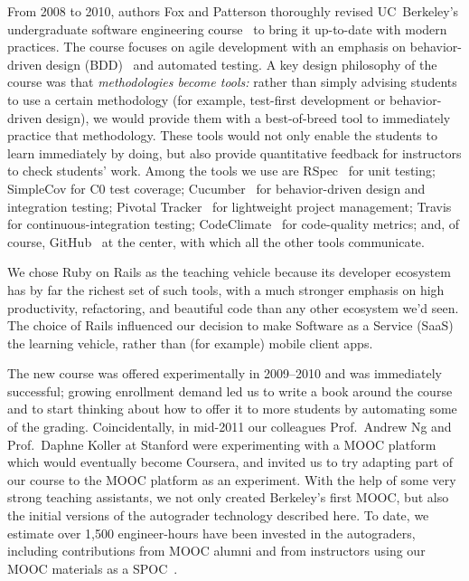 From 2008 to 2010, authors Fox and Patterson thoroughly revised
UC~Berkeley's undergraduate software engineering
course~\cite{crossing_the_software_chasm,agile_sw_curriculum} to bring
it up-to-date with modern practices.  The course focuses on agile
development with an emphasis on
behavior-driven design (BDD)~\cite{bdd} and automated testing.  A key
design philosophy of the course was that \emph{methodologies become
tools:\/} rather than simply advising students to use a certain
methodology (for example, test-first development or behavior-driven
design), we would provide them with a best-of-breed tool to immediately
practice that methodology.  These tools would not only enable the
students to learn immediately by doing, but also provide quantitative
feedback for instructors to check students' work.  Among the tools we
use are 
RSpec~ for unit testing; 
SimpleCov for C0 test coverage; 
Cucumber~ for behavior-driven design and integration testing; 
Pivotal Tracker~ for lightweight project management;
Travis~ for continuous-integration testing; 
CodeClimate~ for code-quality metrics;
and, of course, GitHub~ at the center, with which all the
other tools communicate.  

We chose Ruby on Rails as the teaching vehicle because its developer
ecosystem has by far the richest set of such tools, with a much stronger
emphasis on high productivity, refactoring, and beautiful code than any
other ecosystem we'd seen.
The choice of Rails influenced our decision to make Software as a
Service (SaaS) the learning vehicle, rather than (for example) mobile
client apps.

The new course was offered experimentally in 2009--2010 and was
immediately successful; growing enrollment demand led 
us to write a book around the course~\cite{esaaS} and to start thinking
about how to offer it to more students by automating some of the
grading.  Coincidentally, in mid-2011 our colleagues Prof.~Andrew Ng
and Prof.~Daphne Koller at Stanford were experimenting with a MOOC
platform which would eventually become Coursera, and invited us to try
adapting part of our course to the MOOC 
platform as an experiment.  With the help of some very strong teaching
assistants, we not only created Berkeley's first MOOC, but also the
initial versions of the autograder technology described here.  To date,
we estimate over 1,500 engineer-hours have been invested in the
autograders, including contributions from MOOC alumni and from
instructors using our MOOC materials as a SPOC~\cite{moocs-spocs-TR}.

